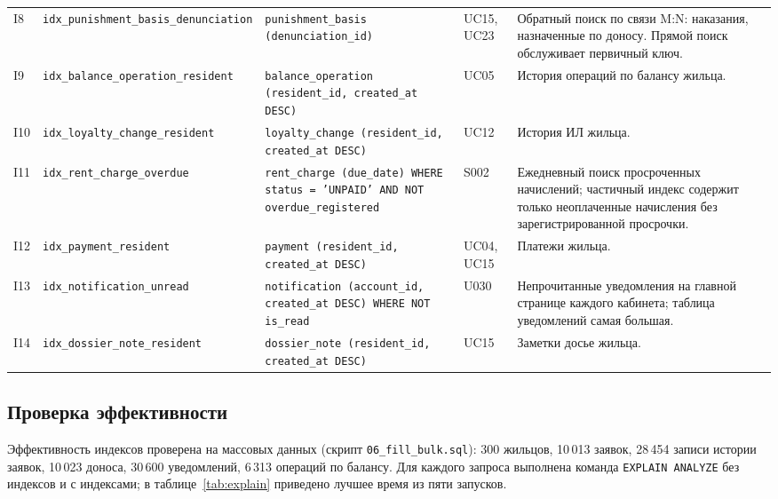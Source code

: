\documentclass[12pt,a4paper]{article}
\begin{document}
\begin{longtable}{L{8.3mm} L{38.9mm} L{48.1mm} L{15.7mm} L{37.0mm}}
I8 & \texttt{idx\_\allowbreak{}punishment\_\allowbreak{}basis\_\allowbreak{}denunciation} & \texttt{\footnotesize punishment\_\allowbreak{}basis (denunciation\_\allowbreak{}id)} & UC15, UC23 & Обратный поиск по связи M:N: наказания, назначенные по доносу. Прямой поиск обслуживает первичный ключ. \\
I9 & \texttt{idx\_\allowbreak{}balance\_\allowbreak{}operation\_\allowbreak{}resident} & \texttt{\footnotesize balance\_\allowbreak{}operation (resident\_\allowbreak{}id, created\_\allowbreak{}at DESC)} & UC05 & История операций по балансу жильца. \\
I10 & \texttt{idx\_\allowbreak{}loyalty\_\allowbreak{}change\_\allowbreak{}resident} & \texttt{\footnotesize loyalty\_\allowbreak{}change (resident\_\allowbreak{}id, created\_\allowbreak{}at DESC)} & UC12 & История ИЛ жильца. \\
I11 & \texttt{idx\_\allowbreak{}rent\_\allowbreak{}charge\_\allowbreak{}overdue} & \texttt{\footnotesize rent\_\allowbreak{}charge (due\_\allowbreak{}date) WHERE status = 'UNPAID' AND NOT overdue\_\allowbreak{}registered} & S002 & Ежедневный поиск просроченных начислений; частичный индекс содержит только неоплаченные начисления без зарегистрированной просрочки. \\
I12 & \texttt{idx\_\allowbreak{}payment\_\allowbreak{}resident} & \texttt{\footnotesize payment (resident\_\allowbreak{}id, created\_\allowbreak{}at DESC)} & UC04, UC15 & Платежи жильца. \\
I13 & \texttt{idx\_\allowbreak{}notification\_\allowbreak{}unread} & \texttt{\footnotesize notification (account\_\allowbreak{}id, created\_\allowbreak{}at DESC) WHERE NOT is\_\allowbreak{}read} & U030 & Непрочитанные уведомления на главной странице каждого кабинета; таблица уведомлений самая большая. \\
I14 & \texttt{idx\_\allowbreak{}dossier\_\allowbreak{}note\_\allowbreak{}resident} & \texttt{\footnotesize dossier\_\allowbreak{}note (resident\_\allowbreak{}id, created\_\allowbreak{}at DESC)} & UC15 & Заметки досье жильца. \\
\end{longtable}
\subsection{Проверка эффективности}
Эффективность индексов проверена на массовых данных (скрипт \texttt{06\_\allowbreak{}fill\_\allowbreak{}bulk.sql}):
300 жильцов, 10\,013 заявок, 28\,454 записи истории заявок, 10\,023 доноса, 30\,600 уведомлений, 6\,313 операций по балансу. Для каждого запроса выполнена команда
\texttt{EXPLAIN ANALYZE} без индексов и с индексами; в таблице~\ref{tab:explain} приведено лучшее
время из пяти запусков.
\end{document}
